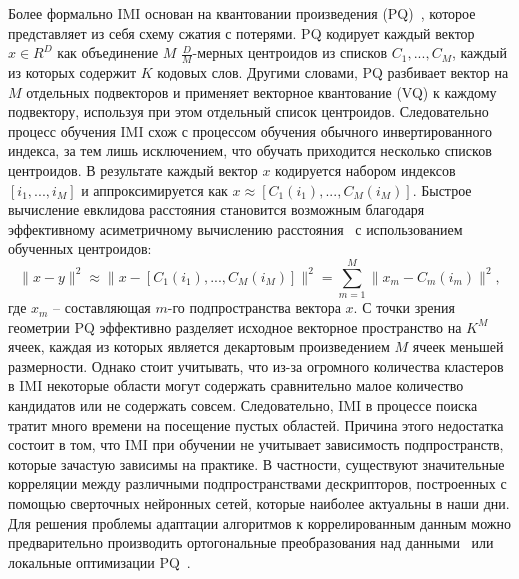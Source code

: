 Более формально IMI основан на квантовании произведения (PQ)~\cite{2}, которое представляет из себя схему сжатия с потерями. PQ кодирует каждый вектор $x\in R^D$ как объединение $M$ $\frac{D}{M}$-мерных центроидов из списков $C_1,..., C_M$, каждый из которых содержит $K$ кодовых слов. Другими словами, PQ разбивает вектор на $M$ отдельных подвекторов и применяет векторное квантование (VQ) к каждому подвектору, используя при этом отдельный список центроидов. Следовательно процесс обучения IMI схож с процессом обучения обычного инвертированного индекса, за тем лишь исключением, что обучать приходится несколько списков центроидов. В результате каждый вектор $x$ кодируется набором индексов $[i_1,..., i_M]$ и аппроксимируется как $x \approx [C_1 (i_1),...,C_M (i_M)]$. Быстрое вычисление евклидова расстояния становится возможным благодаря эффективному асиметричному вычислению расстояния~\cite{2} с использованием обученных центроидов:
$$\|x - y\|^2 \approx \|x - [C_1 (i_1),..., C_M(i_M)]\|^2 = \sum_{m=1}^M\|x_m - C_m(i_m)\|^2,$$
где $x_m$ -- составляющая $m$-го подпространства вектора $x$. С точки зрения геометрии PQ эффективно разделяет исходное векторное пространство на $K^M$ ячеек, каждая из которых является декартовым произведением $M$ ячеек меньшей размерности. Однако стоит учитывать, что из-за огромного количества кластеров в IMI некоторые области могут содержать сравнительно малое количество кандидатов или не содержать совсем. Следовательно, IMI в процессе поиска тратит много времени на посещение пустых областей. Причина этого недостатка состоит в том, что IMI при обучении не учитывает зависимость подпространств, которые зачастую зависимы на практике. В частности, существуют значительные корреляции между различными подпространствами дескрипторов, построенных с помощью сверточных нейронных сетей, которые наиболее актуальны в наши дни. Для решения проблемы адаптации алгоритмов к коррелированным данным можно предварительно производить ортогональные преобразования над данными~\cite{4,6} или локальные оптимизации PQ~\cite{5}.